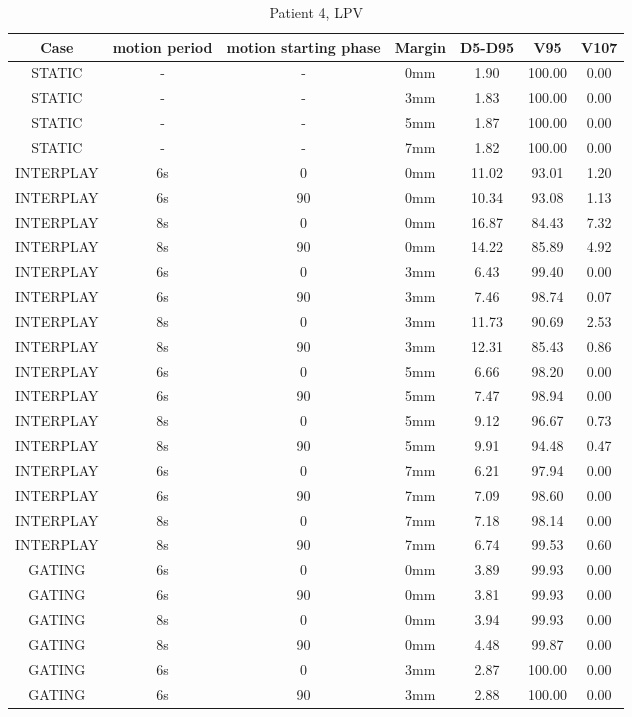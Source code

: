 \begin{table}[H]
  \centering
  \caption{Patient 4, LPV}
  \begin{tabular}{|c||c|c|c||c|c|c|}
    \hline\hline
    Case & motion period & motion starting phase & Margin & D5-D95 & V95 & V107\\
    \hline 
STATIC & - & - & 0mm & 1.90 & 100.00 & 0.00 \\
STATIC & - & - & 3mm & 1.83 & 100.00 & 0.00 \\
STATIC & - & - & 5mm & 1.87 & 100.00 & 0.00 \\
STATIC & - & - & 7mm & 1.82 & 100.00 & 0.00 \\
INTERPLAY & 6s & 0 & 0mm & 11.02 & 93.01 & 1.20 \\
INTERPLAY & 6s & 90 & 0mm & 10.34 & 93.08 & 1.13 \\
INTERPLAY & 8s & 0 & 0mm & 16.87 & 84.43 & 7.32 \\
INTERPLAY & 8s & 90 & 0mm & 14.22 & 85.89 & 4.92 \\
INTERPLAY & 6s & 0 & 3mm & 6.43 & 99.40 & 0.00 \\
INTERPLAY & 6s & 90 & 3mm & 7.46 & 98.74 & 0.07 \\
INTERPLAY & 8s & 0 & 3mm & 11.73 & 90.69 & 2.53 \\
INTERPLAY & 8s & 90 & 3mm & 12.31 & 85.43 & 0.86 \\
INTERPLAY & 6s & 0 & 5mm & 6.66 & 98.20 & 0.00 \\
INTERPLAY & 6s & 90 & 5mm & 7.47 & 98.94 & 0.00 \\
INTERPLAY & 8s & 0 & 5mm & 9.12 & 96.67 & 0.73 \\
INTERPLAY & 8s & 90 & 5mm & 9.91 & 94.48 & 0.47 \\
INTERPLAY & 6s & 0 & 7mm & 6.21 & 97.94 & 0.00 \\
INTERPLAY & 6s & 90 & 7mm & 7.09 & 98.60 & 0.00 \\
INTERPLAY & 8s & 0 & 7mm & 7.18 & 98.14 & 0.00 \\
INTERPLAY & 8s & 90 & 7mm & 6.74 & 99.53 & 0.60 \\
GATING & 6s & 0 & 0mm & 3.89 & 99.93 & 0.00 \\
GATING & 6s & 90 & 0mm & 3.81 & 99.93 & 0.00 \\
GATING & 8s & 0 & 0mm & 3.94 & 99.93 & 0.00 \\
GATING & 8s & 90 & 0mm & 4.48 & 99.87 & 0.00 \\
GATING & 6s & 0 & 3mm & 2.87 & 100.00 & 0.00 \\
GATING & 6s & 90 & 3mm & 2.88 & 100.00 & 0.00 \\

\end{tabular}
\end{table}
